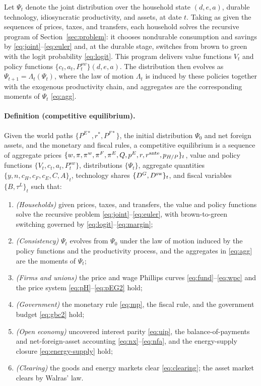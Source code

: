 Let $\Psi_t$ denote the joint distribution over the household state
$(d, e, a)$, durable technology, idiosyncratic productivity, and assets, at date
$t$. Taking as given the sequences of prices, taxes, and transfers, each household
solves the recursive program of Section~\ref{sec:problem}: it chooses nondurable
consumption and savings by \eqref{eq:joint}--\eqref{eq:euler} and, at the durable
stage, switches from brown to green with the logit probability \eqref{eq:logit}.
This program delivers value functions $V_t$ and policy functions
$\{c_t, a_t, P^{sw}_t\}(d, e, a)$. The distribution then evolves as
$\Psi_{t+1}=\Lambda_t(\Psi_t)$, where the law of motion $\Lambda_t$ is induced by
these policies together with the exogenous productivity chain, and aggregates are the
corresponding moments of $\Psi_t$ \eqref{eq:agg}.

\paragraph{Definition (competitive equilibrium).}
Given the world paths $\{P^{E*},r^{*},P^{F*}\}$, the initial distribution $\Psi_0$
and net foreign assets, and the monetary and fiscal rules, a competitive equilibrium
is a sequence of aggregate prices
$\{w,\pi,\pi^{w},\pi^{F},\pi^{E},Q,p^{E}, r, r^{\mathrm{ante}},p_{H/P}\}_t$, value and
policy functions $\{V_t, c_t, a_t, P^{sw}_t\}$, distributions $\{\Psi_t\}$, aggregate
quantities $\{y, n, c_H, c_F, c_E, C, A\}_t$, technology shares $\{D^{G},D^{\mathrm{sw}}\}_t$, and fiscal
variables $\{B,\tau^{L}\}_t$ such that:
\begin{enumerate}[label=(\roman*),leftmargin=2.2em, itemsep=1pt]
\item \emph{(Households)} given prices, taxes, and transfers, the value and policy
functions solve the recursive problem \eqref{eq:joint}--\eqref{eq:euler}, with
brown-to-green switching governed by \eqref{eq:logit}--\eqref{eq:margin};
\item \emph{(Consistency)} $\Psi_t$ evolves from $\Psi_0$ under the law of motion
induced by the policy functions and the productivity process, and the aggregates in
\eqref{eq:agg} are the moments of $\Psi_t$;
\item \emph{(Firms and unions)} the price and wage Phillips curves
\eqref{eq:fund}--\eqref{eq:wpc} and the price system
\eqref{eq:pH}--\eqref{eq:pEG2} hold;
\item \emph{(Government)} the monetary rule \eqref{eq:mp}, the fiscal rule, and the
government budget \eqref{eq:gbc2} hold;
\item \emph{(Open economy)} uncovered interest parity \eqref{eq:uip}, the
balance-of-payments and net-foreign-asset accounting
\eqref{eq:nx}--\eqref{eq:nfa}, and the energy-supply closure
\eqref{eq:energy-supply} hold;
\item \emph{(Clearing)} the goods and energy markets clear \eqref{eq:clearing}; the
asset market clears by Walras' law.
\end{enumerate}

